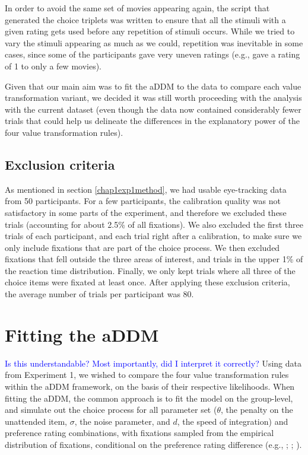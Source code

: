 \documentclass[11pt,a4paper]{article}
\newcommand{\AT}[1] {{\textcolor{blue}{#1}}}
\begin{document}
In order to avoid the same set of movies appearing again, the script that generated the choice triplets was written to ensure that all the stimuli with a given rating gets used before any repetition of stimuli occurs. While we tried to vary the stimuli appearing as much as we could, repetition was inevitable in some cases, since some of the participants gave very uneven ratings (e.g., gave a rating of 1 to only a few movies). 

Given that our main aim was to fit the aDDM to the data to compare each value transformation variant, we decided it was still worth proceeding with the analysis with the current dataset (even though the data now contained considerably fewer trials that could help us delineate the differences in the explanatory power of the four value transformation rules). 

\subsection{Exclusion criteria}

As mentioned in section  \ref{chap1exp1method}, we had usable eye-tracking data from 50 participants. For a few participants, the calibration quality was not satisfactory in some parts of the experiment, and therefore we excluded these trials (accounting for about 2.5\% of all fixations). We also excluded the first three trials of each participant, and each trial right after a calibration, to make sure we only include fixations that are part of the choice process. We then excluded fixations that fell outside the three areas of interest, and trials in the upper 1\% of the reaction time distribution. Finally, we only kept trials where all three of the choice items were fixated at least once. After applying these exclusion criteria, the average number of trials per participant was 80.


\section{Fitting the aDDM}

\AT{Is this understandable? Most importantly, did I interpret it correctly?}
Using data from Experiment 1, we wished to compare the four value transformation rules within the aDDM framework, on the basis of their respective likelihoods. When fitting the aDDM, the common approach is to fit the model on the group-level, and simulate out the choice process for all parameter set ($\theta$, the penalty on the unattended item, $\sigma$, the noise parameter, and $d$, the speed of integration) and preference rating combinations, with fixations sampled from the empirical distribution of fixations, conditional on the preference rating difference  (e.g., ; ; ). 
\end{document}
